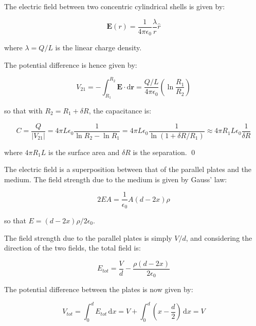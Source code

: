 \documentclass[12pt]{article}
\begin{document}
The electric field between two concentric cylindrical shells is given by:

\begin{equation}
    \mathbf{E}(r) = \frac{1}{4\pi \epsilon_{0}} \frac{\lambda}{r} \hat{r}
\end{equation}

where $\lambda = Q/L$ is the linear charge density.

The potential difference is hence given by:

\begin{equation}
    V_{21} = -\int_{R_{1}}^{R_{2}} \mathbf{E} \cdot \mathrm{d}\mathbf{r} = \frac{Q/L}{4\pi \epsilon_{0}} \left( \ln{\frac{R_{1}}{R_{2}}} \right)
\end{equation}

so that with $R_{2} = R_{1} + \delta R$, the capacitance is:

\begin{equation}
    C = \frac{Q}{\left\lvert V_{21} \right\rvert} = 4\pi L \epsilon_{0} \frac{1}{\ln{R_{2}} - \ln{R_{1}}} = 4\pi L \epsilon_{0} \frac{1}{\ln{(1 + \delta R/R_{1})}} \approx 4\pi R_{1} L \epsilon_{0} \frac{1}{\delta R}
\end{equation}

where $4\pi R_{1} L$ is the surface area and $\delta R$ is the separation.
\qed


The electric field is a superposition between that of the parallel plates and the medium. The field strength due to the medium is given by Gauss' law:

\begin{equation}
    2EA = \frac{1}{\epsilon_{0}} A (d - 2x) \rho
\end{equation}

so that $E = (d - 2x) \rho/2\epsilon_{0}$.

The field strength due to the parallel plates is simply $V/d$, and considering the direction of the two fields, the total field is:

\begin{equation}
    E_{tot} = \frac{V}{d} - \frac{\rho (d - 2x)}{2 \epsilon_{0}}
\end{equation}

The potential difference between the plates is now given by:

\begin{equation}
    V_{tot} = \int_{0}^{d} E_{tot} \, \mathrm{d}x = V + \int_{0}^{d} \left( x - \frac{d}{2} \right) \, \mathrm{d}x = V
\end{equation}
\end{document}
